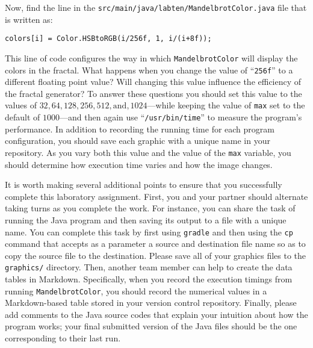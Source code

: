 \documentclass[11pt]{article}
\newcommand{\secondprogram}{\lstinline{MandelbrotColor}}
\newcommand{\secondprogramsource}{\lstinline{src/main/java/labten/MandelbrotColor.java}}
\newcommand{\command}[1]{``\lstinline{#1}''}
\newcommand{\program}[1]{\lstinline{#1}}
\begin{document}
\noindent
Now, find the line in the \secondprogramsource{} file that is written as:

\vspace*{.5em}
{\tt colors[i] = Color.HSBtoRGB(i/256f, 1, i/(i+8f));}
\vspace*{.5em}

\noindent This line of code configures the way in which \secondprogram{} will display the colors in the fractal. What
happens when you change the value of ``{\tt 256f}'' to a different floating point value? Will changing this value
influence the efficiency of the fractal generator? To answer these questions you should set this value to the values of
$32, 64, 128, 256, 512, \mbox{and}, 1024$---while keeping the value of {\tt max} set to the default of $1000$---and then
again use \command{/usr/bin/time} to measure the program's performance. In addition to recording the running time for
each program configuration, you should save each graphic with a unique name in your repository. As you vary both this
value and the value of the {\tt max} variable, you should determine how execution time varies and how the image changes.

It is worth making several additional points to ensure that you successfully complete this laboratory assignment. First,
you and your partner should alternate taking turns as you complete the work. For instance, you can share the task of
running the Java program and then saving its output to a file with a unique name. You can complete this task by first
using \program{gradle} and then using the \program{cp} command that accepts as a parameter a source and destination file
name so as to copy the source file to the destination. Please save all of your graphics files to the \program{graphics/}
directory. Then, another team member can help to create the data tables in Markdown. Specifically, when you record the
execution timings from running \secondprogram{}, you should record the numerical values in a Markdown-based table stored
in your version control repository. Finally, please add comments to the Java source codes that explain your intuition
about how the program works; your final submitted version of the Java files should be the one corresponding to their
last run.


\end{document}
